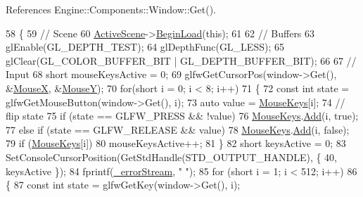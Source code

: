 References Engine\+::\+Components\+::\+Window\+::\+Get().


\begin{DoxyCode}
58 \{
59     \textcolor{comment}{// Scene}
60     \mbox{\hyperlink{classEngine_1_1BaseEngine_adb3dbc839da9d821e08b18d8a221698d}{ActiveScene}}->\mbox{\hyperlink{classEngine_1_1Components_1_1Scene_af18bd334fe66952b8d79b8e9e99ab2d8}{BeginLoad}}(\textcolor{keyword}{this});
61 
62     \textcolor{comment}{// Buffers}
63     glEnable(GL\_DEPTH\_TEST);
64     glDepthFunc(GL\_LESS);
65     glClear(GL\_COLOR\_BUFFER\_BIT | GL\_DEPTH\_BUFFER\_BIT);
66 
67     \textcolor{comment}{// Input}
68     \textcolor{keywordtype}{short} mouseKeysActive = 0;
69     glfwGetCursorPos(window->Get(), &\mbox{\hyperlink{classEngine_1_1BaseEngine_a5fe085152ebe93346900407f6b41a034}{MouseX}}, &\mbox{\hyperlink{classEngine_1_1BaseEngine_a143c9c32dbbdc70bf1546ffe275bf384}{MouseY}});
70     \textcolor{keywordflow}{for}(\textcolor{keywordtype}{short} i = 0; i < 8; i++)
71     \{
72         \textcolor{keyword}{const} \textcolor{keywordtype}{int} state = glfwGetMouseButton(window->Get(), i);
73         \textcolor{keyword}{auto} value = \mbox{\hyperlink{classEngine_1_1BaseEngine_a3ee2bdddb66d45b8c808ffd937ba9c50}{MouseKeys}}[i];
74         \textcolor{comment}{// flip state}
75         \textcolor{keywordflow}{if} (state == GLFW\_PRESS && !value)
76             \mbox{\hyperlink{classEngine_1_1BaseEngine_a3ee2bdddb66d45b8c808ffd937ba9c50}{MouseKeys}}.\mbox{\hyperlink{classGeneric_1_1Dictionary_ae7cb006f801b21c172e8fbac8794fa99}{Add}}(i, \textcolor{keyword}{true});
77         \textcolor{keywordflow}{else} \textcolor{keywordflow}{if} (state == GLFW\_RELEASE && value)
78             \mbox{\hyperlink{classEngine_1_1BaseEngine_a3ee2bdddb66d45b8c808ffd937ba9c50}{MouseKeys}}.\mbox{\hyperlink{classGeneric_1_1Dictionary_ae7cb006f801b21c172e8fbac8794fa99}{Add}}(i, \textcolor{keyword}{false});
79         \textcolor{keywordflow}{if} (\mbox{\hyperlink{classEngine_1_1BaseEngine_a3ee2bdddb66d45b8c808ffd937ba9c50}{MouseKeys}}[i])
80             mouseKeysActive++;
81     \}
82     \textcolor{keywordtype}{short} keysActive = 0;
83     SetConsoleCursorPosition(GetStdHandle(STD\_OUTPUT\_HANDLE), \{ 40, keysActive \});
84     fprintf(\mbox{\hyperlink{classEngine_1_1BaseEngine_a26fd54a1ee2733f9c654af5afcfa96cf}{\_errorStream}}, \textcolor{stringliteral}{"                           "});
85     \textcolor{keywordflow}{for} (\textcolor{keywordtype}{short} i = 1; i < 512; i++)
86     \{
87         \textcolor{keyword}{const} \textcolor{keywordtype}{int} state = glfwGetKey(window->Get(), i);

\end{DoxyCode}
